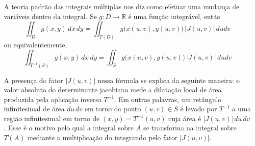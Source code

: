 \documentclass[12pt,portuguese]{article}
\theoremstyle{definition}
\theoremstyle{plainexercise}
\theoremstyle{starredexercise}
\theoremstyle{definition}
\begin{document}
A teoria padrão das integrais múltiplas nos diz como efetuar uma mudança de
variáveis dentro da integral. 
Se $g : D \to \mathbb{R}$ é uma função integrável, então
\begin{equation}
\label{eq:mudanca-variaveis-integral}
  \iint_D g(x, y)\,dx\,dy
  = \iint_{T(D)} g\bigl(x(u, v), y(u, v)\bigr)\,|J(u, v)|\, dudv
\end{equation}
ou equivalentemente,
\begin{equation}
\label{eq:mudanca-variaveis-integral-v2}
  \iint_{T^{-1}(S)} g(x, y)\,dx\,dy
  = \iint_{S} g\bigl(x(u, v), y(u, v)\bigr)\,|J(u, v)|\, dudv
\end{equation}


A presença do fator $|J(u, v)|$ nessa fórmula se explica da seguinte maneira:
o valor absoluto do determinante jacobiano mede a dilatação local de área
produzida pela aplicação inversa $T^{-1}$. Em outras palavras, um retângulo
infinitesimal de área $du\,dv$ em torno do ponto $(u, v) \in S$ é levado por
$T^{-1}$ a uma região infinitesimal em torno de $(x, y) = T^{-1}(u, v)$ cuja
área é $|J(u, v)|\,du\,dv$. Esse é o motivo pelo qual a integral sobre $A$ se
transforma na integral sobre $T(A)$ mediante a multiplicação do integrando pelo
fator $|J(u, v)|$.
\end{document}
